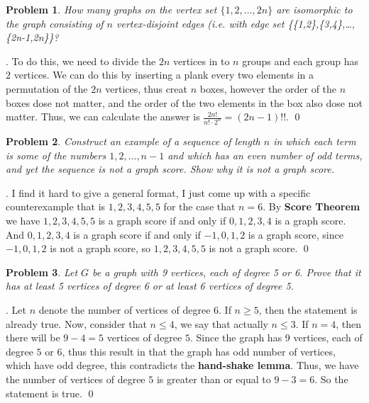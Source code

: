 \documentclass[12pt]{article}
\newtheorem{hw}{Problem}
\newenvironment{sol}
  {\par\vspace{3mm}\noindent{\it Solution}.}
  {\qed}
\begin{document}
\begin{hw}
How many graphs on the vertex set $\{1,2,\ldots,2n\}$ are isomorphic to the graph consisting of $n$ vertex-disjoint edges (i.e. with edge set \{\{1,2\},\{3,4\},\ldots, \{2n-1,2n\}\}?
\end{hw}
\begin{sol}
	To do this, we need to divide the $2n$ vertices in to $n$ groups and each group has $2$ vertices. We can do this by inserting a plank every two elements in a permutation of the $2n$ vertices, thus creat $n$ boxes, however the order of the $n$ boxes dose not matter, and the order of the two elements in the box also dose not matter. Thus, we can calculate the answer is $\frac{2n!}{n! \cdot 2^{n}} = (2n-1)!!$.
\end{sol}

\begin{hw}
Construct an example of a sequence of length $n$ in which each term is some of the numbers $1,2,\ldots, n-1$ and which has an even number of odd terms, and yet the sequence is not a graph score. Show why it is not a graph score.
\end{hw}
\begin{sol}
	I find it hard to give a general format, I just come up with a specific counterexample that is $1,2,3,4,5,5$ for the case that $n=6$. By \textbf{Score Theorem} we have $1,2,3,4,5,5$ is a graph score if and only if $0,1,2,3,4$ is a graph score. And $0,1,2,3,4$ is a graph score if and only if $-1,0,1,2$ is a graph score, since $-1,0,1,2$ is not a graph score, so $1,2,3,4,5,5$ is not a graph score.
\end{sol}

\begin{hw}
Let $G$ be a graph with 9 vertices, each of degree 5 or 6. Prove that it has at least 5 vertices of degree 6 or at least 6 vertices of degree 5.
\end{hw}
\begin{sol}
	Let $n$ denote the number of vertices of degree $6$. If $n \geq 5$, then the statement is already true. Now, consider that $n \leq 4$, we say that actually $n \leq 3$. If $n = 4$, then there will be $9-4=5$ vertices of degree $5$. Since the graph has 9 vertices, each of degree $5$ or $6$, thus this result in that the graph has odd number of vertices, which have odd degree, this contradicts the \textbf{hand-shake lemma}. Thus, we have the number of vertices of degree $5$ is greater than or equal to $9-3=6$. So the statement is true.
\end{sol}
\end{document}

